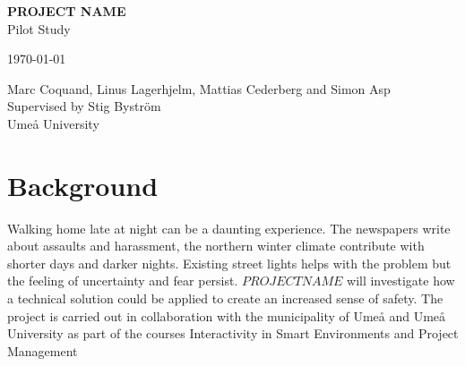 \documentclass[twoside]{report}
\begin{document}
\begin{titlepage}
	\raggedright
  {\Large{\colorbox{front}{\color{white} \textbf{PROJECT NAME}\kern 1pc}}\\\vspace{0.3cm}}
  {Pilot Study\\}
  \vfill
	{\large \today\par}
  {\small\color{gray} Marc Coquand, Linus Lagerhjelm, Mattias Cederberg and Simon
  Asp\\}
  {\small\color{gray} Supervised by Stig Byström}\\
  {\small\color{gray} Umeå University\\}


\end{titlepage}

\renewcommand{\baselinestretch}{1.0}

\newpage

\pagecolor{front}\afterpage{\nopagecolor}\thispagestyle{empty}

 \newpage

\tableofcontents
\thispagestyle{empty}
\newpage

\section{Background}

Walking home late at night can be a daunting experience. The newspapers write
about assaults and harassment, the northern winter climate contribute with
shorter days and darker nights. Existing street lights helps with the problem
but the feeling of uncertainty and fear persist. $PROJECTNAME$ will investigate
how a technical solution could be applied to create an increased sense of
safety. The project is carried out in collaboration with the municipality of
Umeå and Umeå University as part of the courses Interactivity in Smart
Environments and Project Management
\end{document}
